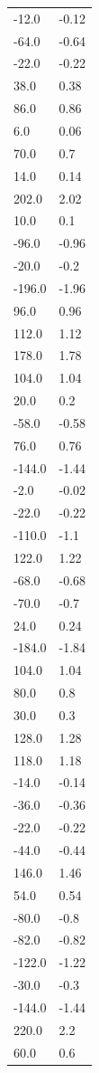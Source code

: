 \begin{longtable}{ll}
-12.0 & -0.12 \\
-64.0 & -0.64 \\
-22.0 & -0.22 \\
38.0 & 0.38 \\
86.0 & 0.86 \\
6.0 & 0.06 \\
70.0 & 0.7 \\
14.0 & 0.14 \\
202.0 & 2.02 \\
10.0 & 0.1 \\
-96.0 & -0.96 \\
-20.0 & -0.2 \\
-196.0 & -1.96 \\
96.0 & 0.96 \\
112.0 & 1.12 \\
178.0 & 1.78 \\
104.0 & 1.04 \\
20.0 & 0.2 \\
-58.0 & -0.58 \\
76.0 & 0.76 \\
-144.0 & -1.44 \\
-2.0 & -0.02 \\
-22.0 & -0.22 \\
-110.0 & -1.1 \\
122.0 & 1.22 \\
-68.0 & -0.68 \\
-70.0 & -0.7 \\
24.0 & 0.24 \\
-184.0 & -1.84 \\
104.0 & 1.04 \\
80.0 & 0.8 \\
30.0 & 0.3 \\
128.0 & 1.28 \\
118.0 & 1.18 \\
-14.0 & -0.14 \\
-36.0 & -0.36 \\
-22.0 & -0.22 \\
-44.0 & -0.44 \\
146.0 & 1.46 \\
54.0 & 0.54 \\
-80.0 & -0.8 \\
-82.0 & -0.82 \\
-122.0 & -1.22 \\
-30.0 & -0.3 \\
-144.0 & -1.44 \\
220.0 & 2.2 \\
60.0 & 0.6 \\

\end{longtable}
